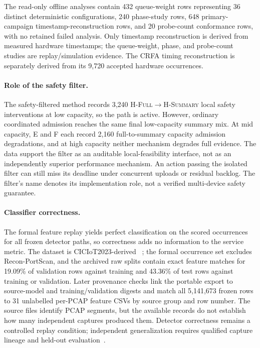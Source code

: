 \documentclass[10pt,journal]{IEEEtran}
\newcommand{\Hsummary}{\textsc{H-Summary}}
\newcommand{\Hfull}{\textsc{H-Full}}
\newcommand{\CRFA}{\textsc{CRFA}}
\begin{document}
The read-only offline analyses contain 432 queue-weight rows representing
36 distinct deterministic configurations, 240 phase-study
rows, 648 primary-campaign timestamp-reconstruction rows, and 20 probe-count
conformance rows, with no retained failed analysis. Only timestamp
reconstruction is derived from measured hardware timestamps; the queue-weight,
phase, and probe-count studies are replay/simulation evidence. The \CRFA{}
timing reconstruction is separately derived from its 9,720 accepted hardware
occurrences.

\paragraph{Role of the safety filter.}
The safety-filtered method records 3,240 \Hfull$\rightarrow$\Hsummary{}
local safety interventions at low capacity, so the path is active. However,
ordinary coordinated admission reaches the same final low-capacity summary
mix. At mid capacity, E and F each record 2,160 full-to-summary capacity
admission degradations, and at high capacity neither mechanism degrades full
evidence. The data support the filter as an auditable local-feasibility
interface, not as an independently superior performance mechanism.
An action passing the isolated filter can still miss its deadline under
concurrent uploads or residual backlog. The filter's name denotes its
implementation role, not a verified multi-device safety guarantee.

\paragraph{Classifier correctness.}
The formal feature replay yields perfect classification on the scored
occurrences for all frozen detector paths, so correctness adds no information
to the service metric. The dataset is CICIoT2023-derived
~\cite{neto2023ciciot}; the formal occurrence set excludes Recon-PortScan,
and the archived raw splits contain exact feature matches for 19.09\% of
validation rows against training and 43.36\% of test rows against training
or validation. Later provenance checks link the portable export to
source-model and training/validation digests and match all 5,141,673 frozen
rows to 31 unlabelled per-PCAP feature CSVs by source group and row number.
The source files identify PCAP segments, but the available records do not
establish how many independent captures produced them.
Detector correctness remains a controlled replay condition;
independent generalization requires qualified capture lineage and held-out
evaluation~\cite{sommer2010closedworld,yang2025openset}.
\end{document}
